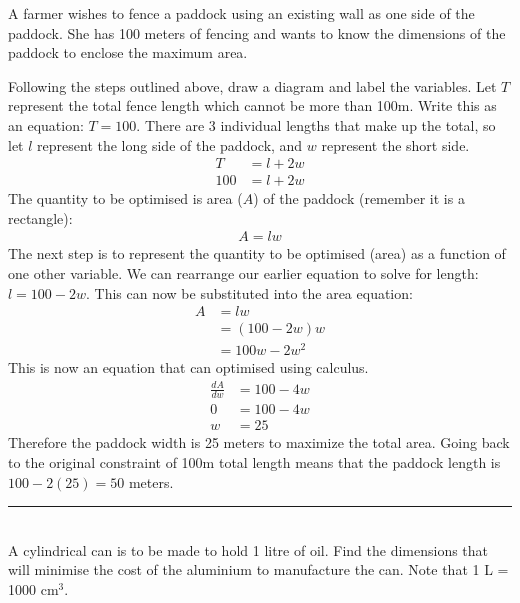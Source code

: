 \example A farmer wishes to fence a paddock using an existing wall as one side of the paddock. She has 100 meters of fencing and wants to know the dimensions of the paddock to enclose the maximum area.
\begin{center}
\end{center}
\solution Following the steps outlined above, draw a diagram and label the variables. Let $T$ represent the total fence length which cannot be more than 100m. Write this as an equation: $T=100$. There are 3 individual lengths that make up the total, so let $l$ represent the long side of the paddock, and $w$ represent the short side. 
\begin{align*}
T&=l+2w\\
100&=l+2w
\end{align*}
The quantity to be optimised is area ($A$) of the paddock (remember it is a rectangle):
\begin{align*}
A=lw
\end{align*}
The next step is to represent the quantity to be optimised (area) as a function of one other variable. We can rearrange our earlier equation to solve for length: $l=100-2w$. This can now be substituted into the area equation:
\begin{align*}
A&=lw\\
&=\left(100-2w\right)w\\
&=100w-2w^2
\end{align*}
This is now an equation that can optimised using calculus.
\begin{align*}
\frac{dA}{dw}&=100-4w\\
0&=100-4w\\
w&=25
\end{align*}
Therefore the paddock width is 25 meters to maximize the total area. Going back to the original constraint of 100m total length means that the paddock length is $100-2(25)=50$ meters.\\
\rule{6.8cm}{0.5pt}\\
\example A cylindrical can is to be made to hold 1 litre of oil. Find the dimensions that will minimise the cost of the aluminium to manufacture the can. Note that 1 L = 1000 cm$^3$.\\

